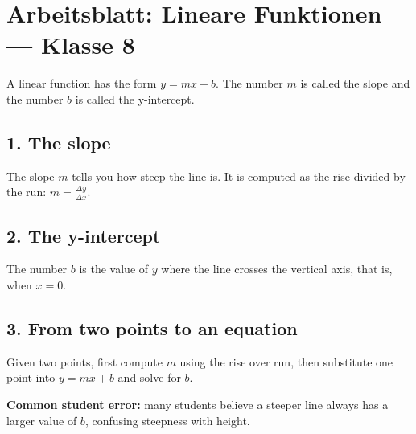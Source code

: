 \documentclass[12pt]{article}\pagestyle{empty}
\begin{document}
\section*{Arbeitsblatt: Lineare Funktionen --- Klasse 8}
A linear function has the form $y = mx + b$. The number $m$ is called the
slope and the number $b$ is called the y-intercept.

\subsection*{1. The slope}
The slope $m$ tells you how steep the line is. It is computed as the rise
divided by the run: $m = \frac{\Delta y}{\Delta x}$.

\subsection*{2. The y-intercept}
The number $b$ is the value of $y$ where the line crosses the vertical axis,
that is, when $x = 0$.

\subsection*{3. From two points to an equation}
Given two points, first compute $m$ using the rise over run, then substitute
one point into $y = mx + b$ and solve for $b$.

\textbf{Common student error:} many students believe a steeper line always has
a larger value of $b$, confusing steepness with height.
\end{document}
